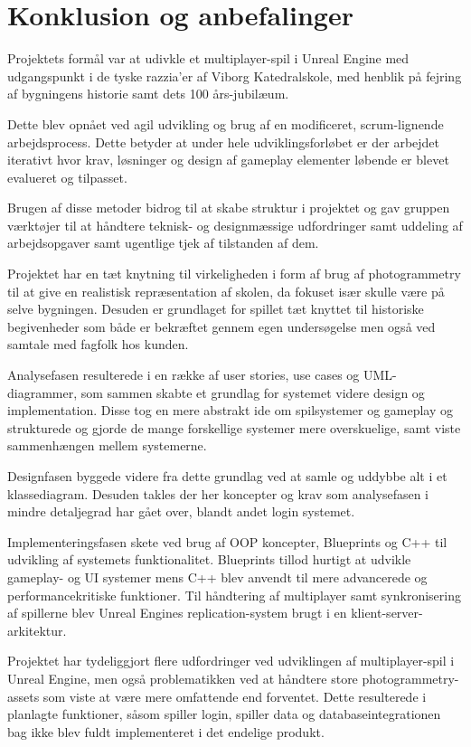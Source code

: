 \section{Konklusion og anbefalinger}
Projektets formål var at udivkle et multiplayer-spil i Unreal Engine med udgangspunkt i de tyske razzia'er af Viborg Katedralskole, med henblik på fejring af bygningens historie samt dets 100 års-jubilæum.

Dette blev opnået ved agil udvikling og brug af en modificeret, scrum-lignende arbejdsprocess. Dette betyder at under hele udviklingsforløbet er der arbejdet iterativt hvor krav, løsninger og design af gameplay elementer løbende er blevet evalueret og tilpasset. 

Brugen af disse metoder bidrog til at skabe struktur i projektet og gav gruppen værktøjer til at håndtere teknisk- og designmæssige udfordringer samt uddeling af arbejdsopgaver samt ugentlige tjek af tilstanden af dem.

Projektet har en tæt knytning til virkeligheden i form af brug af photogrammetry til at give en realistisk repræsentation af skolen, da fokuset især skulle være på selve bygningen. Desuden er grundlaget for spillet tæt knyttet til historiske begivenheder som både er bekræftet gennem egen undersøgelse men også ved samtale med fagfolk hos kunden.

Analysefasen resulterede i en række af user stories, use cases og UML-diagrammer, som sammen skabte et grundlag for systemet videre design og implementation. Disse tog en mere abstrakt ide om spilsystemer og gameplay og strukturede og gjorde de mange forskellige systemer mere overskuelige, samt viste sammenhængen mellem systemerne. 

Designfasen byggede videre fra dette grundlag ved at samle og uddybbe alt i et klassediagram. Desuden takles der her koncepter og krav som analysefasen i mindre detaljegrad har gået over, blandt andet login systemet. 

Implementeringsfasen skete ved brug af OOP koncepter, Blueprints og C++ til udvikling af systemets funktionalitet. Blueprints tillod hurtigt at udvikle gameplay- og UI systemer mens C++ blev anvendt til mere advancerede og performancekritiske funktioner. Til håndtering af multiplayer samt synkronisering af spillerne blev Unreal Engines replication-system brugt i en klient-server-arkitektur. 

Projektet har tydeliggjort flere udfordringer ved udviklingen af multiplayer-spil i Unreal Engine, men også problematikken ved at håndtere store photogrammetry-assets som viste at være mere omfattende end forventet. Dette resulterede i planlagte funktioner, såsom spiller login, spiller data og databaseintegrationen bag ikke blev fuldt implementeret i det endelige produkt. 

